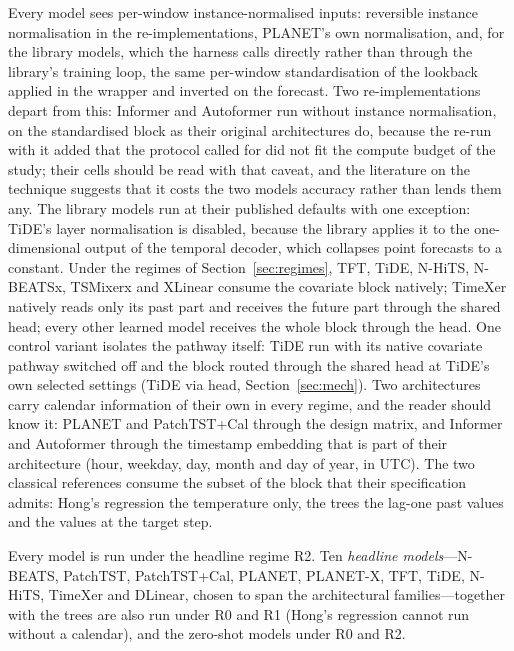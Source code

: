 Every model sees per-window instance-normalised inputs: reversible instance normalisation in
the re-implementations, PLANET's own normalisation, and, for the library models, which the
harness calls directly rather than through the library's training loop, the same per-window
standardisation of the lookback applied in the wrapper and inverted on the forecast. Two
re-implementations depart from this: Informer and Autoformer run without instance
normalisation, on the standardised block as their original architectures do, because the
re-run with it added that the protocol called for did not fit the compute budget of the study;
their cells should be read with that caveat, and the literature on the technique
\cite{kim2022revin} suggests that it costs the two models accuracy rather than lends them any. The
library models run at their published defaults with one exception: TiDE's layer
normalisation is disabled, because the library applies it to the one-dimensional output of
the temporal decoder, which collapses point forecasts to a constant. Under the regimes of
Section~\ref{sec:regimes}, TFT, TiDE, N-HiTS, N-BEATSx, TSMixerx and XLinear consume the
covariate block natively; TimeXer natively reads only its
past part and receives the future part through the shared head; every other learned model
receives the whole block through the head. One control variant isolates the pathway itself:
TiDE run with its native covariate pathway switched off and the block routed through the shared
head at TiDE's own selected settings (TiDE via head, Section~\ref{sec:mech}). Two architectures
carry calendar information of their own in every regime, and the reader should know it: PLANET
and PatchTST+Cal through the
design matrix, and Informer and Autoformer through the timestamp embedding that is part of
their architecture (hour, weekday, day, month and day of year, in UTC). The two classical
references consume the subset of the block that their specification admits: Hong's regression
the temperature only, the trees the lag-one past values and the values at the target step.

Every model is run under the headline regime R2. Ten \emph{headline models}---N-BEATS,
PatchTST, PatchTST+Cal, PLANET, PLANET-X, TFT, TiDE, N-HiTS, TimeXer and DLinear, chosen to
span the architectural families---together with the trees are also run under R0 and R1 (Hong's
regression cannot run without a calendar), and the zero-shot models under R0 and R2.

